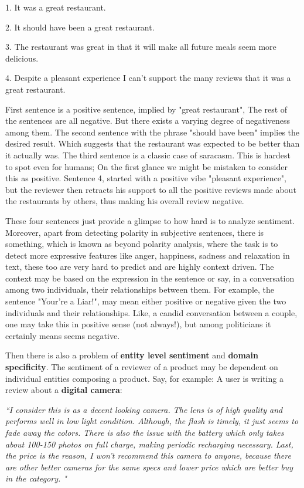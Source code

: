 1. It was a great restaurant.

2. It should have been a great restaurant.

3. The restaurant was great in that it will make all future meals seem more delicious.

4. Despite a pleasant experience I can’t support the many reviews that it was a great restaurant.

First sentence is a positive sentence, implied by "great restaurant", The rest of the sentences are all negative. But there exists a varying degree of negativeness among them. The second sentence with the phrase "should have been" implies the desired result. Which suggests that the restaurant was expected to be better than it actually was. The third sentence is a classic case of saracasm. This is hardest to spot even for humans; On the first glance we might be mistaken to consider this as positive. Sentence 4, started with a positive vibe "pleasant experience", but the reviewer then retracts his support to all the positive reviews made about the restaurants by others, thus making his overall review negative. 

These four sentences just provide a glimpse to how hard is to analyze sentiment. Moreover, apart from detecting polarity in subjective sentences, there is something, which is known as beyond polarity analysis, where the task is to detect more expressive features like anger, happiness, sadness and relaxation in text, these too are very hard to predict and are highly context driven. The context may be based on the expression in the sentence or say, in a conversation among two individuals, their relationships between them. For example, the sentence "Your're a Liar!", may mean either positive or negative given the two individuals and their relationships. Like, a candid conversation between a couple, one may take this in positive sense (not always!), but among politicians it certainly means seems negative. 

Then there is also a problem of \textbf{entity level sentiment} and \textbf{domain specificity}. The sentiment of a reviewer of a product may be dependent on individual entities composing a product. Say, for example: A user is writing a review about a \textbf{digital camera}: 

\textit{``I consider this is as a decent looking camera. The lens is of high quality and performs well in low light condition. Although, the flash is timely, it just seems to fade away the colors. There is also the issue with the battery which only takes about 100-150 photos on full charge, making periodic recharging necessary. Last, the price is the reason, I won't recommend this camera to anyone, because there are other better cameras for the same specs and lower price which are better buy in the category. "}

